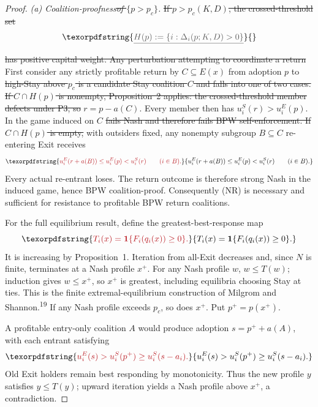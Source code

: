 \documentclass[12pt]{article}
\theoremstyle{definition}
\theoremstyle{remark}
\providecommand{\DIFaddtex}[1]{{\color{AddedText}#1}}
\providecommand{\DIFdeltex}[1]{{\color{DeletedText}\sout{#1}}}
\providecommand{\DIFaddbegin}{}
\providecommand{\DIFaddend}{}
\providecommand{\DIFdelbegin}{}
\providecommand{\DIFdelend}{}
\providecommand{\DIFadd}[1]{\texorpdfstring{\DIFaddtex{#1}}{#1}} %
\providecommand{\DIFdel}[1]{\texorpdfstring{\DIFdeltex{#1}}{}} %
\begin{document}
\begin{proof}
\emph{(a) Coalition-proofness\DIFdelbegin \DIFdel{of $\{p > p_c\}$}\DIFdelend .} \DIFdelbegin \DIFdel{If $p > p_c(K, D)$, the crossed-threshold set
}\[
\DIFdel{H(p) := \{i : \Delta_i(p; K, D) > 0\}
}\]%
\DIFdel{has positive capital weight. Any perturbation attempting to coordinate
a return }\DIFdelend \DIFaddbegin \DIFadd{First consider any strictly profitable return by $C\subseteq E(x)$ from adoption $p$ }\DIFaddend to \DIFdelbegin \DIFdel{high-Stay above $p_c$ is a candidate Stay coalition
$C$ and falls into one of two cases. If $C \cap H(p)$ is nonempty, Proposition~2 applies: the crossed-threshold member
defects under P3, so }\DIFdelend \DIFaddbegin \DIFadd{$r=p-a(C)$. Every member then has $u_i^S(r)>u_i^E(p)$. In the game induced on }\DIFaddend $C$ \DIFdelbegin \DIFdel{fails Nash and therefore fails BPW
self-enforcement. If $C \cap H(p)$
is empty, }\DIFdelend \DIFaddbegin \DIFadd{with outsiders fixed, any nonempty subgroup $B\subseteq C$ re-entering Exit receives
}\[
 \DIFadd{u_i^E(r+a(B))\le u_i^E(p)<u_i^S(r)\qquad(i\in B).
}\]
\DIFadd{Every actual re-entrant loses. The return outcome is therefore strong Nash in the induced game, hence BPW coalition-proof. Consequently (NR) is necessary and sufficient for resistance to profitable BPW return coalitions.
}

\DIFadd{For the full equilibrium result, define the greatest-best-response map
}\[
 \DIFadd{T_i(x)=\mathbf{1}\{F_i(q_i(x))\ge0\}.
}\]
\DIFadd{It is increasing by Proposition~1. Iteration from all-Exit decreases and, since $N$ is finite, terminates at a Nash profile $x^+$. For any Nash profile $w$, $w\le T(w)$; induction gives $w\le x^+$, so $x^+$ is greatest, including equilibria choosing Stay at ties. This is the finite extremal-equilibrium construction of Milgrom and Shannon.\textsuperscript{19} If any Nash profile exceeds $p_c$, so does $x^+$. Put $p^+=p(x^+)$.
}

\DIFadd{A profitable entry-only coalition $A$ would produce adoption $s=p^++a(A)$, with each entrant satisfying
}\[
 \DIFadd{u_i^E(s)>u_i^S(p^+)\ge u_i^S(s-a_i).
}\]
\DIFadd{Old Exit holders remain best responding by monotonicity. Thus the new profile $y$ satisfies $y\le T(y)$; upward iteration yields a Nash profile above $x^+$, a contradiction.
}


\end{proof}
\end{document}
